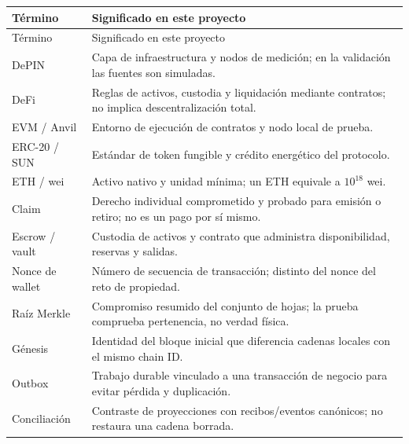 \begin{longtable}{L{.24\linewidth}L{.66\linewidth}}
\toprule Término & Significado en este proyecto \\ \midrule\endfirsthead
\toprule Término & Significado en este proyecto \\ \midrule\endhead
DePIN & Capa de infraestructura y nodos de medición; en la validación las fuentes son simuladas.\\
DeFi & Reglas de activos, custodia y liquidación mediante contratos; no implica descentralización total.\\
EVM / Anvil & Entorno de ejecución de contratos y nodo local de prueba.\\
ERC-20 / SUN & Estándar de token fungible y crédito energético del protocolo.\\
ETH / wei & Activo nativo y unidad mínima; un ETH equivale a $10^{18}$ wei.\\
Claim & Derecho individual comprometido y probado para emisión o retiro; no es un pago por sí mismo.\\
Escrow / vault & Custodia de activos y contrato que administra disponibilidad, reservas y salidas.\\
Nonce de wallet & Número de secuencia de transacción; distinto del nonce del reto de propiedad.\\
Raíz Merkle & Compromiso resumido del conjunto de hojas; la prueba comprueba pertenencia, no verdad física.\\
Génesis & Identidad del bloque inicial que diferencia cadenas locales con el mismo chain ID.\\
Outbox & Trabajo durable vinculado a una transacción de negocio para evitar pérdida y duplicación.\\
Conciliación & Contraste de proyecciones con recibos/eventos canónicos; no restaura una cadena borrada.\\
\bottomrule
\end{longtable}
